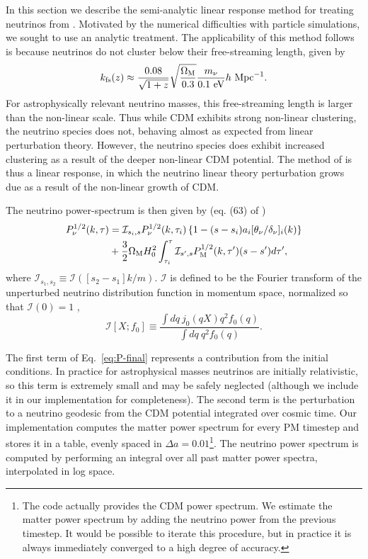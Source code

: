 \documentclass[useAMS, usenatbib]{mnras}
\begin{document}
In this section we describe the semi-analytic linear response method for treating neutrinos from \cite{AHB}.
Motivated by the numerical difficulties with particle simulations, we sought to use an analytic treatment.
The applicability of this method follows is because neutrinos do not cluster below their free-streaming length, given by
\begin{equation}
 k_{\rm fs}(z) \approx \frac{0.08}{\sqrt{1+z}}
\sqrt{\frac{\Omega_{\rm M}}{0.3}} \frac{m_{\nu}}{0.1 ~ \textrm{eV}} h~ \textrm{Mpc}^{-1}.
\label{eq:kfs}
\end{equation}
For astrophysically relevant neutrino masses, this free-streaming length is larger than the non-linear scale.
Thus while CDM exhibits strong non-linear clustering, the neutrino species does not, behaving
almost as expected from linear perturbation theory. However, the neutrino species does exhibit increased clustering
as a result of the deeper non-linear CDM potential. The method of \cite{AHB} is thus a linear response,
in which the neutrino linear theory perturbation grows due as a result of the non-linear growth of CDM.

The neutrino power-spectrum is then given by (eq. (63) of \cite{AHB})
\begin{align}
P_{\nu}^{1/2}(k, \tau) &= \mathcal{I}_{s_i, s}
P_{\nu}^{1/2}(k, \tau_i) \left\{1 - (s - s_i)  a_i [\theta_{\nu}/\delta_{\nu}]_{i}(k)\right\}\nonumber\\
&+ \frac32 \Omega_{\rm M} H_0^2 \int_{\tau_i}^{\tau} \mathcal{I}_{s', s}
P^{1/2}_{\rm M}(k, \tau') (s - s')d \tau', \label{eq:P-final}
\end{align}
where $\mathcal{I}_{s_1, s_2} \equiv \mathcal{I}([s_2 -s_1]k/m)$. $\mathcal{I}$ is defined to be
the Fourier transform of the unperturbed neutrino distribution function in momentum space, normalized so
that $\mathcal{I}(0) = 1$ \citep{Brandenberger_1987, Bertschinger_Watts_1988},
\begin{equation}
\mathcal{I}[X; f_0] \equiv \frac{\int dq~ j_0(q X) q^2 f_0(q) }{\int dq ~q^2 f_0(q)}. \label{eq:I.def}
\end{equation}

The first term of Eq.~\ref{eq:P-final} represents a contribution from the initial conditions. In practice
for astrophysical masses neutrinos are initially relativistic, so this term is extremely small and may
be safely neglected (although we include it in our implementation for completeness).
The second term is the perturbation to a neutrino geodesic from the CDM potential
integrated over cosmic time. Our implementation computes the matter power spectrum for every PM timestep
and stores it in a table, evenly spaced in $\Delta a = 0.01$\footnote{The code actually provides the CDM power spectrum.
We estimate the matter power spectrum by adding the neutrino power from the previous timestep. It would be possible
to iterate this procedure, but in practice it is always immediately converged to a high degree of accuracy.}.
The neutrino power spectrum is computed by performing an integral over all past matter power spectra, interpolated in log space.
\end{document}
